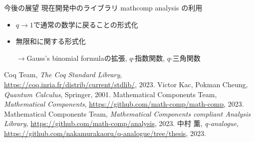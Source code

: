 \documentclass[dvipdfmx,cjk]{beamer}
\theoremstyle{mystyle}
\newcommand{\0}{\textbf{0}}
\begin{document}
\begin{frame}{今後の展望}
	現在開発中のライブラリ mathcomp analysis\cite{coq ana} の利用 \pause
	\begin{itemize}
		\item $q \to 1$で通常の数学に戻ることの形式化 \pause
		\item 無限和に関する形式化 \pause
		
		$\to$Gauss's binomial formulaの拡張, 
		$q$-指数関数, $q$-三角関数
	\end{itemize}	
\end{frame}
\begin{thebibliography}{9}
	 Coq Team, {\it The Coq Standard Library}, 
		\url{https://coq.inria.fr/distrib/current/stdlib/}, 2023.
	 Victor Kac, Pokman Cheung, {\it{Quantum Calculus}}, Springer, 2001.
	 Mathematical Components Team, {\it Mathematical Components}, 		
		\url{https://github.com/math-comp/math-comp}, 2023.
	 Mathematical Components Team, 
		{\it Mathematical Components compliant Analysis Library}, 
			\url{https://github.com/math-comp/analysis}, 2023.
	 中村 薫, {\it q-analogue}, 
		\url{https://github.com/nakamurakaoru/q-analogue/tree/thesis}, 2023.
\end{thebibliography}
\end{document}
